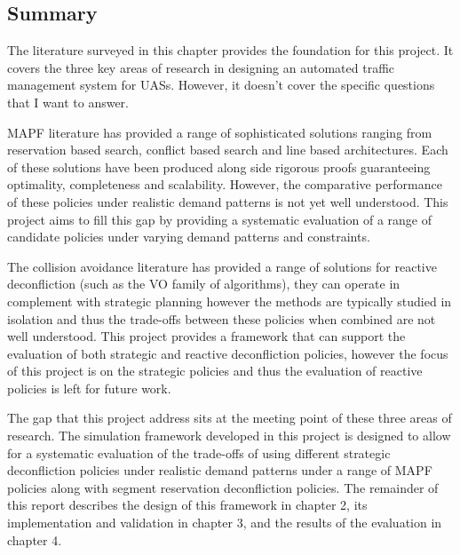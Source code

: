 \vspace{1em}

\subsection{Summary}
\label{sec:lit-summary}

The literature surveyed in this chapter provides the foundation for this project. It covers the three key areas of research in designing an automated traffic management system for UASs. However, it doesn't cover the specific questions that I want to answer. \par

MAPF literature has provided a range of sophisticated solutions ranging from reservation based search, conflict based search and line based architectures. Each of these solutions have been produced along side rigorous proofs guaranteeing optimality, completeness and scalability. However, the comparative performance of these policies under realistic demand patterns is not yet well understood. This project aims to fill this gap by providing a systematic evaluation of a range of candidate policies under varying demand patterns and constraints. \par

\vspace{1em}

The collision avoidance literature has provided a range of solutions for reactive deconfliction (such as the VO family of algorithms), they can operate in complement with strategic planning however the methods are typically studied in isolation and thus the trade-offs between these policies when combined are not well understood. This project provides a framework that can support the evaluation of both strategic and reactive deconfliction policies, however the focus of this project is on the strategic policies and thus the evaluation of reactive policies is left for future work. \par

\vspace{1em}

The gap that this project address sits at the meeting point of these three areas of research. The simulation framework developed in this project is designed to allow for a systematic evaluation of the trade-offs of using different strategic deconfliction policies under realistic demand patterns under a range of MAPF policies along with segment reservation deconfliction policies. The remainder of this report describes the design of this framework in chapter 2, its implementation and validation in chapter 3, and the results of the evaluation in chapter 4. \par

\vspace{1em}